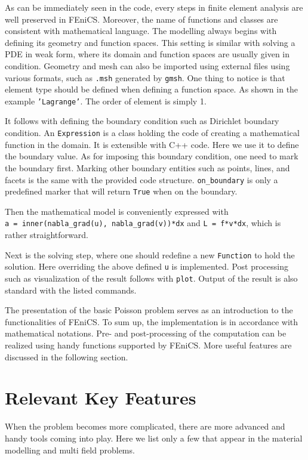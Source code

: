 \documentclass[10pt,a4paper]{scrreprt}
\begin{document}
As can be immediately seen in the code, every steps in finite element analysis are well preserved in FEniCS. Moreover, the name of functions and classes are consistent with mathematical language. The modelling always begins with defining its geometry and function spaces. This setting is similar with solving a PDE in weak form, where its domain and function spaces are usually given in condition. Geometry and mesh can also be imported using external files using various formats, such as \texttt{.msh} generated by \texttt{gmsh}. One thing to notice is that element type should be defined when defining a function space. As shown in the example \texttt{'Lagrange’}. The order of element is simply 1.

It follows with defining the boundary condition such as Dirichlet boundary condition. An \texttt{Expression} is a class holding the code of creating a mathematical function in the domain. It is extensible with C++ code. Here we use it to define the boundary value. As for imposing this boundary condition, one need to mark the boundary first. Marking other boundary entities such as points, lines, and facets is the same with the provided code structure. \texttt{on\_boundary} is only a predefined marker that will return \texttt{True} when on the boundary.

Then the mathematical model is conveniently expressed with \texttt{a\ =\ inner(nabla\_grad(u),\ nabla\_grad(v))*dx} and \texttt{L\ =\ f*v*dx}, which is rather straightforward.

Next is the solving step, where one should redefine a new \texttt{Function} to hold the solution. Here overriding the above defined \texttt{u} is implemented. Post processing such as visualization of the result follows with \texttt{plot}. Output of the result is also standard with the listed commands.

The presentation of the basic Poisson problem serves as an introduction to the functionalities of FEniCS. To sum up, the implementation is in accordance with mathematical notations. Pre- and post-processing of the computation can be realized using handy functions supported by FEniCS. More useful features are discussed in the following section.

\section{Relevant Key Features}
When the problem becomes more complicated, there are more advanced and handy tools coming into play. Here we list only a few that appear in the material modelling and multi field problems.
\end{document}
